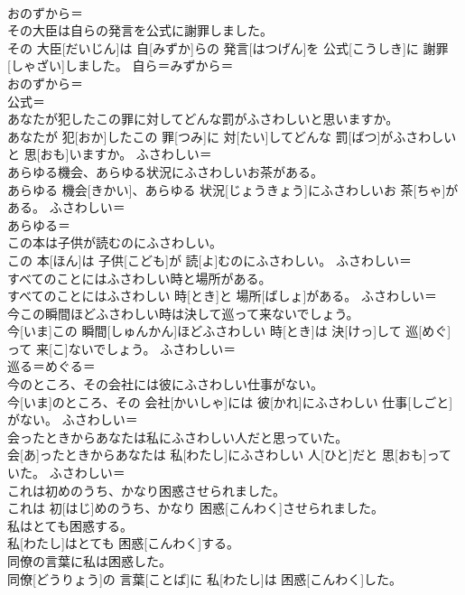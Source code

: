 \documentclass[8pt]{extreport}
\begin{document}
\begin{CJK}{UTF8}{min}
\\	おのずから＝ 
\\	その大臣は自らの発言を公式に謝罪しました。	
\\	その 大臣[だいじん]は 自[みずか]らの 発言[はつげん]を 公式[こうしき]に 謝罪[しゃざい]しました。	自ら＝みずから＝ 
\\	おのずから＝ 
\\	公式＝ 
\\	あなたが犯したこの罪に対してどんな罰がふさわしいと思いますか。	
\\	あなたが 犯[おか]したこの 罪[つみ]に 対[たい]してどんな 罰[ばつ]がふさわしいと 思[おも]いますか。	ふさわしい＝ 
\\	あらゆる機会、あらゆる状況にふさわしいお茶がある。	
\\	あらゆる 機会[きかい]、あらゆる 状況[じょうきょう]にふさわしいお 茶[ちゃ]がある。	ふさわしい＝ 
\\	あらゆる＝ 
\\	この本は子供が読むのにふさわしい。	
\\	この 本[ほん]は 子供[こども]が 読[よ]むのにふさわしい。	ふさわしい＝ 
\\	すべてのことにはふさわしい時と場所がある。	
\\	すべてのことにはふさわしい 時[とき]と 場所[ばしょ]がある。	ふさわしい＝ 
\\	今この瞬間ほどふさわしい時は決して巡って来ないでしょう。	
\\	今[いま]この 瞬間[しゅんかん]ほどふさわしい 時[とき]は 決[けっ]して 巡[めぐ]って 来[こ]ないでしょう。	ふさわしい＝ 
\\	巡る＝めぐる＝ 
\\	今のところ、その会社には彼にふさわしい仕事がない。	
\\	今[いま]のところ、その 会社[かいしゃ]には 彼[かれ]にふさわしい 仕事[しごと]がない。	ふさわしい＝ 
\\	会ったときからあなたは私にふさわしい人だと思っていた。	
\\	会[あ]ったときからあなたは 私[わたし]にふさわしい 人[ひと]だと 思[おも]っていた。	ふさわしい＝ 
\\	これは初めのうち、かなり困惑させられました。	
\\	これは 初[はじ]めのうち、かなり 困惑[こんわく]させられました。	
\\	私はとても困惑する。	
\\	私[わたし]はとても 困惑[こんわく]する。	
\\	同僚の言葉に私は困惑した。	
\\	同僚[どうりょう]の 言葉[ことば]に 私[わたし]は 困惑[こんわく]した。	

\end{CJK}
\end{document}
